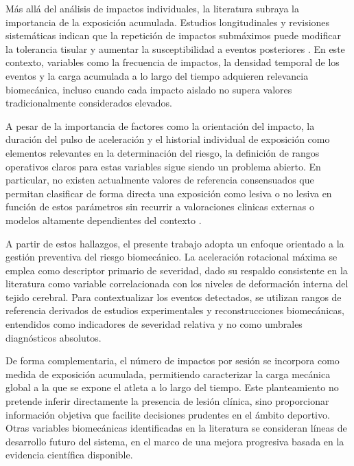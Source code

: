 Más allá del análisis de impactos individuales, la literatura subraya la importancia de la exposición acumulada. Estudios longitudinales y revisiones sistemáticas indican que la repetición de impactos submáximos puede modificar la tolerancia tisular y aumentar la susceptibilidad a eventos posteriores \cite{Guskiewicz2011,Tierney2024,Lota2022}. En este contexto, variables como la frecuencia de impactos, la densidad temporal de los eventos y la carga acumulada a lo largo del tiempo adquieren relevancia biomecánica, incluso cuando cada impacto aislado no supera valores tradicionalmente considerados elevados.

A pesar de la importancia de factores como la orientación del impacto, la duración del pulso de aceleración y el historial individual de exposición como elementos relevantes en la determinación del riesgo, la definición de rangos operativos claros para estas variables sigue siendo un problema abierto. En particular, no existen actualmente valores de referencia consensuados que permitan clasificar de forma directa una exposición como lesiva o no lesiva en función de estos parámetros sin recurrir a valoraciones clinicas externas o modelos altamente dependientes del contexto \cite{Guskiewicz2011,Tierney2024}.

A partir de estos hallazgos, el presente trabajo adopta un enfoque orientado a la gestión preventiva del riesgo biomecánico. La aceleración rotacional máxima se emplea como descriptor primario de severidad, dado su respaldo consistente en la literatura como variable correlacionada con los niveles de deformación interna del tejido cerebral. Para contextualizar los eventos detectados, se utilizan rangos de referencia derivados de estudios experimentales y reconstrucciones biomecánicas, entendidos como indicadores de severidad relativa y no como umbrales diagnósticos absolutos. 

De forma complementaria, el número de impactos por sesión se incorpora como medida de exposición acumulada, permitiendo caracterizar la carga mecánica global a la que se expone el atleta a lo largo del tiempo. Este planteamiento no pretende inferir directamente la presencia de lesión clínica, sino proporcionar información objetiva que facilite decisiones prudentes en el ámbito deportivo. Otras variables biomecánicas identificadas en la literatura se consideran líneas de desarrollo futuro del sistema, en el marco de una mejora progresiva basada en la evidencia científica disponible.



